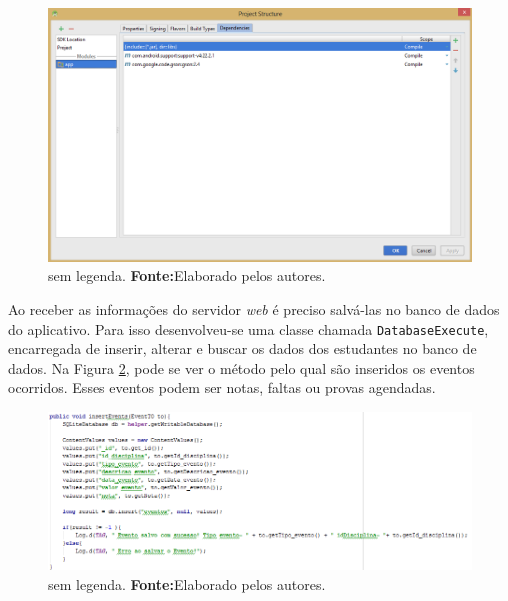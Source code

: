 	\begin{figure}[h!] 
		\centerline{\includegraphics[scale=0.45]{./imagens/2_q_metodologico/4_procedimentos_resultados/42_aplicativo/aplicativo5.png}}
		\caption[sem legenda]{sem legenda. \textbf{Fonte:}Elaborado pelos autores.}
		\label{fig:aplicativo5}
	\end{figure}

	\pagebreak
	
	\par Ao receber as informações do servidor \textit{web} é preciso salvá-las no
banco de dados do aplicativo. Para isso desenvolveu-se uma classe chamada
\texttt{DatabaseExecute}, encarregada de inserir, alterar e buscar os dados dos
estudantes no banco de dados. Na Figura \ref{fig:aplicativo6}, pode se ver o método
pelo qual são inseridos os eventos ocorridos. Esses eventos podem ser notas, faltas ou provas
agendadas.


	\begin{figure}[h!] 
		\centerline{\includegraphics[scale=0.60]{./imagens/2_q_metodologico/4_procedimentos_resultados/42_aplicativo/aplicativo6.png}}
		\caption[sem legenda]{sem legenda. \textbf{Fonte:}Elaborado pelos autores.}
		\label{fig:aplicativo6}
	\end{figure}

